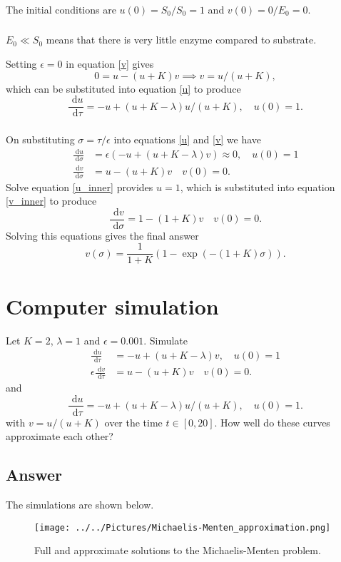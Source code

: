 \documentclass[]{article}
\newcommand{\bb}{\begin{equation}}
\newcommand{\ee}{\end{equation}}
\newcommand{\rd}{\text{ d}}
\newcommand{\eqn}[1]{equation \eqref{#1}}
\newcommand{\eqns}[2]{equations \eqref{#1} and \eqref{#2}}
\renewcommand{\l}{\left(}
\renewcommand{\r}{\right)}
\begin{document}
\begin{Answ}
\subsubsection{}
The initial conditions are $u(0)=S_0/S_0=1$ and $v(0)=0/E_0=0$.
\subsubsection{}
$E_0\ll S_0$ means that there is very little enzyme compared to substrate.

Setting $\epsilon=0$ in \eqn{v} gives
\bb
0=u-(u+K)v\implies v=u/(u+K),
\ee
which can be substituted into \eqn{u} to produce
\bb
\frac{\rd u}{\rd \tau}=-u+(u+K-\lambda)u/(u+K),\quad u(0)=1.\ee
\subsubsection{}
On substituting $\sigma=\tau/\epsilon$ into \eqns{u}{v} we have 
\begin{align}
\frac{\rd u}{\rd \sigma}&=\epsilon\l-u+(u+K-\lambda)v\r\approx 0,\quad u(0)=1\label{u_inner}\\
\frac{\rd v}{\rd \sigma}&=u-(u+K)v\quad v(0)=0.\label{v_inner}
\end{align}
Solve \eqn{u_inner} provides $u=1$, which is substituted into \eqn{v_inner} to produce
\bb
\frac{\rd v}{\rd \sigma}=1-(1+K)v\quad v(0)=0.
\ee
Solving this equations gives the final answer
\bb
v(\sigma)= \frac{1}{1+K}\l 1-\exp(-(1+K)\sigma)\r.
\ee

\end{Answ}

\section{Computer simulation}
Let $K=2$, $\lambda=1$ and $\epsilon=0.001$. Simulate
\begin{align}
\frac{\rd u}{\rd \tau}&=-u+(u+K-\lambda)v, \quad u(0)=1\\
\epsilon\frac{\rd v}{\rd \tau}&=u-(u+K)v \quad v(0)=0.
\end{align}
and 
\bb
\frac{\rd u}{\rd \tau}=-u+(u+K-\lambda)u/(u+K),\quad u(0)=1.
\ee
with $v=u/(u+K)$ over the time $t\in[0,20]$. How well do these curves approximate each other?
\begin{Answ}
\subsection{Answer}
The simulations are shown below.
\begin{figure}[h!!!tb]
\centering
\texttt{[image: ../../Pictures/Michaelis-Menten\_approximation.png]}
\caption{\label{Michaelis-Menten} Full and approximate solutions to the Michaelis-Menten problem.}
\end{figure}
\end{Answ}
\end{document}
